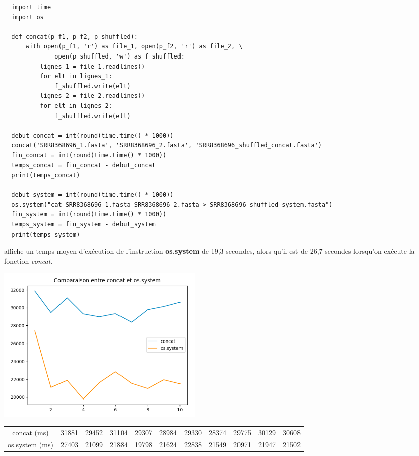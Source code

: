 \documentclass[twoside,a4paper,11pt,frenchb,openany]{report}
\begin{document}
\begin{verbatim}
  import time
  import os

  def concat(p_f1, p_f2, p_shuffled):
      with open(p_f1, 'r') as file_1, open(p_f2, 'r') as file_2, \
              open(p_shuffled, 'w') as f_shuffled:
          lignes_1 = file_1.readlines()
          for elt in lignes_1:
              f_shuffled.write(elt)
          lignes_2 = file_2.readlines()
          for elt in lignes_2:
              f_shuffled.write(elt)

  debut_concat = int(round(time.time() * 1000))
  concat('SRR8368696_1.fasta', 'SRR8368696_2.fasta', 'SRR8368696_shuffled_concat.fasta')
  fin_concat = int(round(time.time() * 1000))
  temps_concat = fin_concat - debut_concat
  print(temps_concat)

  debut_system = int(round(time.time() * 1000))
  os.system("cat SRR8368696_1.fasta SRR8368696_2.fasta > SRR8368696_shuffled_system.fasta")
  fin_system = int(round(time.time() * 1000))
  temps_system = fin_system - debut_system
  print(temps_system)
\end{verbatim}

affiche un temps moyen d'exécution de l'instruction \textbf{os.system} de 19,3 secondes, alors qu'il est de 26,7 secondes lorsqu'on exécute la fonction \textit{concat}.

\includegraphics[width=10cm]{comparaison_concat.png}

\begin{tabular}{c|c|c|c|c|c|c|c|c|c|c}
concat (ms) & 31881 & 29452 & 31104 & 29307 & 28984 & 29330 & 28374 & 29775 & 30129 & 30608 \\
os.system (ms) & 27403 & 21099 & 21884 & 19798 & 21624 & 22838 & 21549 & 20971 & 21947 & 21502
\end{tabular}
\end{document}
